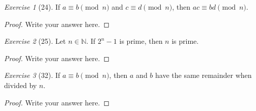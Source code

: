 \documentclass[12pt]{amsart}
\theoremstyle{remark}
\newtheorem*{exercise}{Exercise}%
\def\NN{\ensuremath{\mathbb N}}
\theoremstyle{mycomment}
\begin{document}
\begin{exercise}[24] If $a\equiv b\pmod n$ and $c\equiv d\pmod n$, then $ac\equiv bd\pmod n$.
\begin{proof}
Write your answer here.
\end{proof}
\end{exercise}


\begin{exercise}[25] Let $n\in\NN$. If $2^{n}-1$ is prime, then $n$ is prime.
\begin{proof}
Write your answer here.
\end{proof}
\end{exercise}

\begin{exercise}[32] If $a\equiv b\pmod n$, then $a$ and $b$ have the same remainder when divided by $n$.
\begin{proof}
Write your answer here.
\end{proof}
\end{exercise}





 
\end{document}
